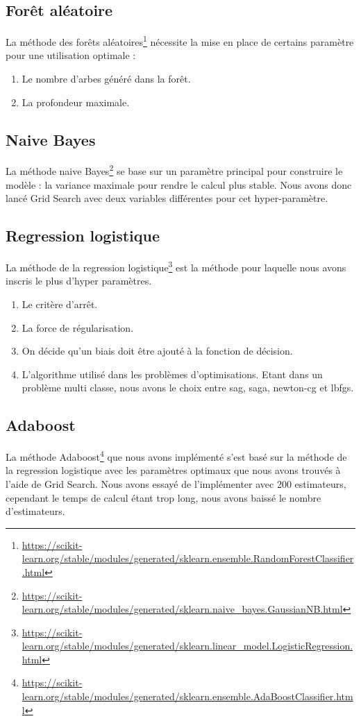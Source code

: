 \documentclass[12pt]{article}
\begin{document}
\subsection{Forêt aléatoire}
La méthode des forêts aléatoires\footnote{\url{https://scikit-learn.org/stable/modules/generated/sklearn.ensemble.RandomForestClassifier.html}} nécessite la mise en place de certains paramètre pour une utilisation optimale :
\begin{enumerate}
\item Le nombre d'arbes généré dans la forêt.
\item La profondeur maximale.
\end{enumerate}

\subsection{Naive Bayes}
La méthode naive Bayes\footnote{\url{https://scikit-learn.org/stable/modules/generated/sklearn.naive_bayes.GaussianNB.html}} se base sur un paramètre principal pour construire le modèle : la variance maximale pour rendre le calcul plus stable. Nous avons donc lancé Grid Search avec deux variables différentes pour cet hyper-paramètre.

\subsection{Regression logistique}
La méthode de la regression logistique\footnote{\url{https://scikit-learn.org/stable/modules/generated/sklearn.linear_model.LogisticRegression.html}} est la méthode pour laquelle nous avons inscris le plus d'hyper paramètres.
\begin{enumerate}
\item Le critère d'arrêt.
\item La force de régularisation.
\item On décide qu'un biais doit être ajouté à la fonction de décision.
\item L'algorithme utilisé dans les problèmes d'optimisations. Etant dans un problème multi classe, nous avons le choix entre sag, saga, newton-cg et lbfgs.
\end{enumerate}

\subsection{Adaboost}
La méthode Adaboost\footnote{\url{https://scikit-learn.org/stable/modules/generated/sklearn.ensemble.AdaBoostClassifier.html}} que nous avons implémenté s'est basé sur la méthode de la regression logistique avec les paramètres optimaux que nous avons trouvés à l'aide de Grid Search. Nous avons essayé de l'implémenter avec 200 estimateurs, cependant le temps de calcul étant trop long, nous avons baissé le nombre d'estimateurs.
\end{document}
